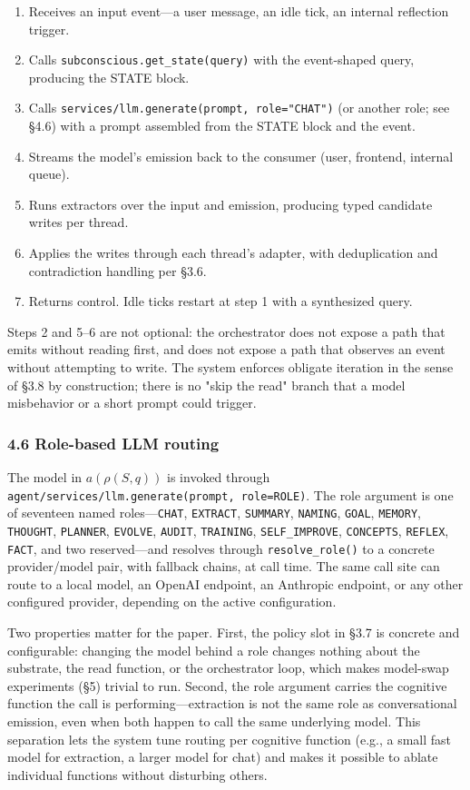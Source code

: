 \documentclass[11pt,letterpaper]{article}
\begin{document}
\begin{enumerate}
  \item Receives an input event---a user message, an idle tick, an internal reflection trigger.
  \item Calls \texttt{subconscious.get\_state(query)} with the event-shaped query, producing the STATE block.
  \item Calls \texttt{services/llm.generate(prompt, role="CHAT")} (or another role; see §4.6) with a prompt assembled from the STATE block and the event.
  \item Streams the model's emission back to the consumer (user, frontend, internal queue).
  \item Runs extractors over the input and emission, producing typed candidate writes per thread.
  \item Applies the writes through each thread's adapter, with deduplication and contradiction handling per §3.6.
  \item Returns control. Idle ticks restart at step 1 with a synthesized query.
\end{enumerate}

Steps 2 and 5–6 are not optional: the orchestrator does not expose a path that emits without reading first, and does not expose a path that observes an event without attempting to write. The system enforces obligate iteration in the sense of §3.8 by construction; there is no "skip the read" branch that a model misbehavior or a short prompt could trigger.

\subsubsection*{4.6 Role-based LLM routing}

The model in $a(\rho(S, q))$ is invoked through \texttt{agent/services/llm.generate(prompt, role=ROLE)}. The role argument is one of seventeen named roles---\texttt{CHAT}, \texttt{EXTRACT}, \texttt{SUMMARY}, \texttt{NAMING}, \texttt{GOAL}, \texttt{MEMORY}, \texttt{THOUGHT}, \texttt{PLANNER}, \texttt{EVOLVE}, \texttt{AUDIT}, \texttt{TRAINING}, \texttt{SELF\_IMPROVE}, \texttt{CONCEPTS}, \texttt{REFLEX}, \texttt{FACT}, and two reserved---and resolves through \texttt{resolve\_role()} to a concrete provider/model pair, with fallback chains, at call time. The same call site can route to a local model, an OpenAI endpoint, an Anthropic endpoint, or any other configured provider, depending on the active configuration.

Two properties matter for the paper. First, the policy slot in §3.7 is concrete and configurable: changing the model behind a role changes nothing about the substrate, the read function, or the orchestrator loop, which makes model-swap experiments (§5) trivial to run. Second, the role argument carries the cognitive function the call is performing---extraction is not the same role as conversational emission, even when both happen to call the same underlying model. This separation lets the system tune routing per cognitive function (e.g., a small fast model for extraction, a larger model for chat) and makes it possible to ablate individual functions without disturbing others.
\end{document}
